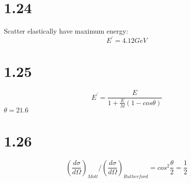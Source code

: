 \documentclass{article}
\begin{document}
\begin{CJK*}{GBK}{song}
\section{1.24}
Scatter elastically have maximum energy:
\begin{equation}
E^{'}=4.12GeV
\end{equation}

\section{1.25}
\begin{equation}
E^{'}=\frac{E}{1+\frac{E}{M}(1-cos\theta)}
\end{equation}
$\theta=21.6$





\section{1.26}
\begin{equation}
(\frac{d\sigma}{d\Omega})_{Mott}/(\frac{d\sigma}{d\Omega})_{Rutherford}=cos^2\frac{\theta}{2}=\frac{1}{2}
\end{equation}









\end{CJK*}
\end{document}
